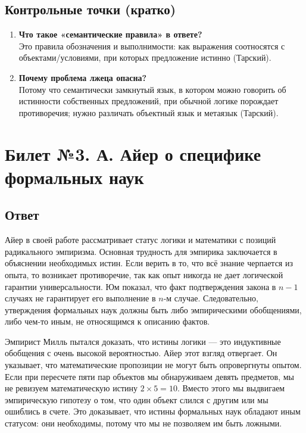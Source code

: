 \documentclass[a4paper,12pt]{article}
\begin{document}
\subsection{Контрольные точки (кратко)}
\begin{enumerate}
  \item \textbf{Что такое «семантические правила» в ответе?}\\
  Это правила обозначения и выполнимости: как выражения соотносятся с объектами/условиями, при которых предложение истинно (Тарский).
  \item \textbf{Почему проблема лжеца опасна?}\\
  Потому что семантически замкнутый язык, в котором можно говорить об истинности собственных предложений, при обычной логике порождает противоречия; нужно различать объектный язык и метаязык (Тарский).
\end{enumerate}

\newpage
\section{Билет №3. А. Айер о специфике формальных наук}

\subsection{Ответ}

Айер в своей работе рассматривает статус логики и математики с позиций радикального эмпиризма. Основная трудность для эмпирика заключается в объяснении необходимых истин. Если верить в то, что всё знание черпается из опыта, то возникает противоречие, так как опыт никогда не дает логической гарантии универсальности. Юм показал, что факт подтверждения закона в $n-1$ случаях не гарантирует его выполнение в $n$-м случае. Следовательно, утверждения формальных наук должны быть либо эмпирическими обобщениями, либо чем-то иным, не относящимся к описанию фактов.

Эмпирист Милль пытался доказать, что истины логики — это индуктивные обобщения с очень высокой вероятностью. Айер этот взгляд отвергает. Он указывает, что математические пропозиции не могут быть опровергнуты опытом. Если при пересчете пяти пар объектов мы обнаруживаем девять предметов, мы не ревизуем математическую истину $2 \times 5 = 10$. Вместо этого мы выдвигаем эмпирическую гипотезу о том, что один объект слился с другим или мы ошиблись в счете. Это доказывает, что истины формальных наук обладают иным статусом: они необходимы, потому что мы не позволяем им быть ложными.
\end{document}
